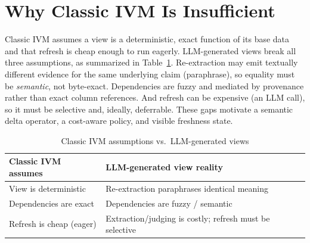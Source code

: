 \documentclass[conference]{IEEEtran}
\begin{document}
\section{Why Classic IVM Is Insufficient}
\label{sec:why}
Classic IVM assumes a view is a deterministic, exact function of its base data
and that refresh is cheap enough to run eagerly. LLM-generated views break all
three assumptions, as summarized in Table~\ref{tab:ivm}. Re-extraction may emit
textually different evidence for the same underlying claim (paraphrase), so
equality must be \emph{semantic}, not byte-exact. Dependencies are fuzzy and
mediated by provenance rather than exact column references. And refresh can be
expensive (an LLM call), so it must be selective and, ideally, deferrable. These
gaps motivate a semantic delta operator, a cost-aware policy, and visible
freshness state.

\begin{table}[t]
\caption{Classic IVM assumptions vs.\ LLM-generated views}
\label{tab:ivm}
\centering
\footnotesize
\begin{tabular}{p{}p{}}
\toprule
\textbf{Classic IVM assumes} & \textbf{LLM-generated view reality}\\
\midrule
View is deterministic & Re-extraction paraphrases identical meaning\\
Dependencies are exact & Dependencies are fuzzy / semantic\\
Refresh is cheap (eager) & Extraction/judging is costly; refresh must be selective\\
\bottomrule
\end{tabular}
\end{table}
\end{document}
